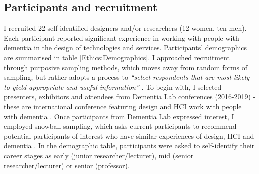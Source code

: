 \subsection{Participants and recruitment}
\label{Ethics:Participants}
I recruited 22 self-identified designers and/or researchers (12 women, ten men). Each participant reported significant experience in working with people with dementia in the design of technologies and services. Participants' demographics are summarised in table \ref{Ethics:Demographics}. I approached recruitment through purposive sampling methods, which moves away from random forms of sampling, but rather adopts a process to \textit{``select respondents that are most likely to yield appropriate and useful information''} \citep[pg.317]{kelly2010qualitative}. To begin with, I selected presenters, exhibitors and attendees from Dementia Lab conferences (2016-2019) - these are international conference featuring design and HCI work with people with dementia \citep{brankaert_dementia_2019}. Once participants from Dementia Lab expressed interest, I employed snowball sampling, which asks current participants to recommend potential participants of interest who have similar experiences of design, HCI and dementia \citep{noy_sampling_2008}. In the demographic table, participants were asked to self-identify their career stages as early (junior researcher/lecturer), mid (senior researcher/lecturer) or senior (professor).

